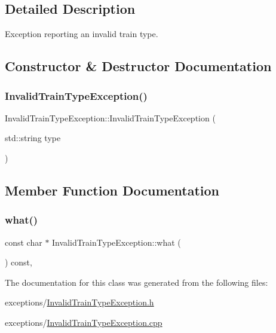 \subsection{Detailed Description}
Exception reporting an invalid train type. 

\subsection{Constructor \& Destructor Documentation}
\mbox{\label{classInvalidTrainTypeException_aa06f57cd1c9c04bc98cece928a6f0ed8}} 
\subsubsection{\texorpdfstring{Invalid\+Train\+Type\+Exception()}{InvalidTrainTypeException()}}
{\footnotesize\ttfamily Invalid\+Train\+Type\+Exception\+::\+Invalid\+Train\+Type\+Exception (\begin{DoxyParamCaption}\item[{std\+::string}]{type }\end{DoxyParamCaption})}



\subsection{Member Function Documentation}
\mbox{\label{classInvalidTrainTypeException_a9eb95875231c7bace498e824f2e746c2}} 
\subsubsection{\texorpdfstring{what()}{what()}}
{\footnotesize\ttfamily const char $\ast$ Invalid\+Train\+Type\+Exception\+::what (\begin{DoxyParamCaption}{ }\end{DoxyParamCaption}) const\hspace{0.3cm}{\ttfamily [override]}, {\ttfamily [noexcept]}}



The documentation for this class was generated from the following files\+:\begin{DoxyCompactItemize}
\item 
exceptions/\mbox{\hyperlink{InvalidTrainTypeException_8h}{Invalid\+Train\+Type\+Exception.\+h}}\item 
exceptions/\mbox{\hyperlink{InvalidTrainTypeException_8cpp}{Invalid\+Train\+Type\+Exception.\+cpp}}\end{DoxyCompactItemize}
